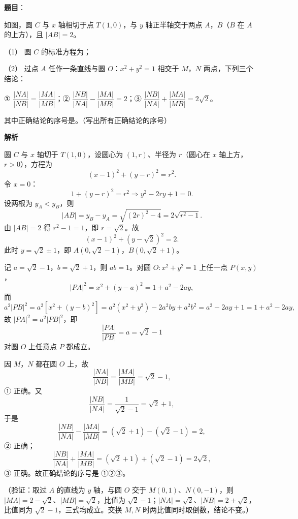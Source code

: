 \begin{answer}

\textbf{题目}：

如图，圆 \(C\) 与 \(x\) 轴相切于点 \(T(1,0)\)，与 \(y\) 轴正半轴交于两点 \(A\)，\(B\)（\(B\) 在 \(A\) 的上方），且 \(|AB|=2\)。

（1） 圆 \(C\) 的标准方程为\gkblank{}；

（2） 过点 \(A\) 任作一条直线与圆 \(O\)：\(x^2+y^2=1\) 相交于 \(M\)，\(N\) 两点，下列三个结论：

① \(\dfrac{|NA|}{|NB|}=\dfrac{|MA|}{|MB|}\)；② \(\dfrac{|NB|}{|NA|}-\dfrac{|MA|}{|MB|}=2\)；③ \(\dfrac{|NB|}{|NA|}+\dfrac{|MA|}{|MB|}=2\sqrt2\)。

其中正确结论的序号是\gkblank{}。（写出所有正确结论的序号）
\nopagebreak[4]
\begin{center}\end{center}
\nopagebreak[4]
\textbf{解析}


圆 \(C\) 与 \(x\) 轴切于 \(T(1,0)\)，设圆心为 \((1,r)\)、半径为 \(r\)（圆心在 \(x\) 轴上方，\(r>0\)），方程为
\nopagebreak[4]
\[
(x-1)^2+(y-r)^2=r^2.
\]
令 \(x=0\)：
\nopagebreak[4]
\[
1+(y-r)^2=r^2\Longrightarrow y^2-2ry+1=0.
\]
设两根为 \(y_A<y_B\)，则
\nopagebreak[4]
\[
|AB|=y_B-y_A=\sqrt{(2r)^2-4}=2\sqrt{r^2-1}.
\]
由 \(|AB|=2\) 得 \(r^2-1=1\)，即 \(r=\sqrt2\)。故
\nopagebreak[4]
\[
(x-1)^2+(y-\sqrt2)^2=2.
\]
此时 \(y=\sqrt2\pm1\)，即 \(A(0,\sqrt2-1)\)，\(B(0,\sqrt2+1)\)。


记 \(a=\sqrt2-1\)，\(b=\sqrt2+1\)，则 \(ab=1\)。对圆 \(O:x^2+y^2=1\) 上任一点 \(P(x,y)\)，
\nopagebreak[4]
\[
|PA|^2=x^2+(y-a)^2=1+a^2-2ay,
\]
而
\nopagebreak[4]
\[
a^2|PB|^2=a^2\left[x^2+(y-b)^2\right]
=a^2(x^2+y^2)-2a^2by+a^2b^2
=a^2-2ay+1=1+a^2-2ay,
\]
故 \(|PA|^2=a^2|PB|^2\)，即
\nopagebreak[4]
\[
\dfrac{|PA|}{|PB|}=a=\sqrt2-1
\]
对圆 \(O\) 上任意点 \(P\) 都成立。

因 \(M\)，\(N\) 都在圆 \(O\) 上，故
\nopagebreak[4]
\[
\dfrac{|NA|}{|NB|}=\dfrac{|MA|}{|MB|}=\sqrt2-1,
\]
① 正确。又
\nopagebreak[4]
\[
\dfrac{|NB|}{|NA|}=\dfrac{1}{\sqrt2-1}=\sqrt2+1,
\]
于是
\nopagebreak[4]
\[
\dfrac{|NB|}{|NA|}-\dfrac{|MA|}{|MB|}=(\sqrt2+1)-(\sqrt2-1)=2,
\]
② 正确；
\nopagebreak[4]
\[
\dfrac{|NB|}{|NA|}+\dfrac{|MA|}{|MB|}=(\sqrt2+1)+(\sqrt2-1)=2\sqrt2,
\]
③ 正确。故正确结论的序号是 ①②③。

（验证：取过 \(A\) 的直线为 \(y\) 轴，与圆 \(O\) 交于 \(M(0,1)\)、\(N(0,-1)\)，则 \(|MA|=2-\sqrt2\)、\(|MB|=\sqrt2\)，比值为 \(\sqrt2-1\)；\(|NA|=\sqrt2\)、\(|NB|=2+\sqrt2\)，比值同为 \(\sqrt2-1\)，三式均成立。交换 \(M,N\) 时两比值同时取倒数，结论不变。）



\end{answer}
